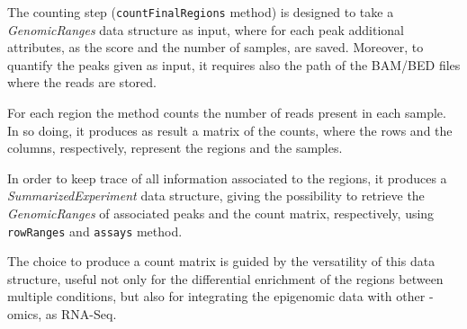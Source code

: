The counting step (\lstinline{countFinalRegions} method) is designed to take a \textit{GenomicRanges} data structure as input, where for each peak additional attributes, as the score and the number of samples, are saved.
Moreover, to quantify the peaks given as input, it requires also the path of the BAM/BED files where the reads are stored.

For each region the method counts the number of reads present in each sample.
In so doing, it produces as result a matrix of the counts, where the rows and the columns, respectively, represent the regions and the samples.

In order to keep trace of all information associated to the regions, it produces a \textit{SummarizedExperiment} \cite{SummExp} data structure, giving the possibility to retrieve the \textit{GenomicRanges} of associated peaks and the count matrix, respectively, using \lstinline{rowRanges} and \lstinline{assays} method.

The choice to produce a count matrix is guided by the versatility of this data structure, useful not only for the differential enrichment of the regions between multiple conditions, but also for integrating the epigenomic data with other -omics, as RNA-Seq.
